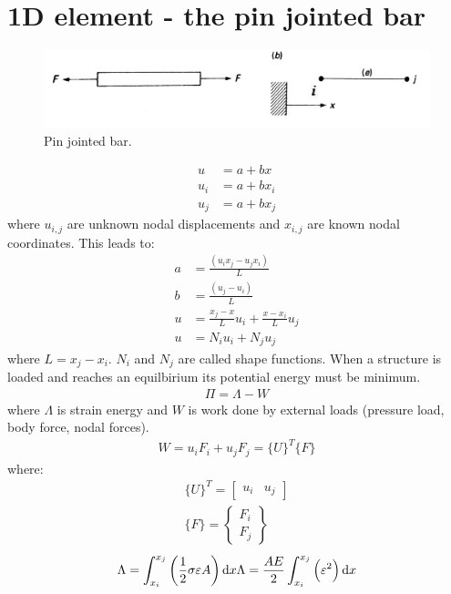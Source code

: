 \documentclass[class=report, crop=false, 12pt,a4paper]{standalone}
\begin{document}
\section{1D element - the pin jointed bar}
\begin{figure}[H]
	\centering
	\includegraphics[width = \textwidth]{../img/figure3.png}
	\caption{Pin jointed bar.}
\end{figure}
\begin{align}
	u &= a + bx\\
	u_i &= a + bx_i\\
	u_j &= a + bx_j
\end{align}
where $u_{i,j}$ are unknown nodal displacements and $x_{i,j}$ are known nodal coordinates. This leads to:
\begin{align}
	a &= \frac{\left(u_ix_j-u_jx_i\right)}{L}\\
	b &= \frac{\left(u_j-u_i\right)}{L}\\
	u&= \frac{x_j-x}{L}u_i + \frac{x-x_i}{L}u_j\\
	u &= N_iu_i + N_ju_j
\end{align}
where $L = x_j - x_i$. $N_i$ and $N_j$ are called shape functions. When a structure is loaded and reaches an equilbirium its potential energy must be minimum.
\begin{gather}
	\Pi = \Lambda - W
\end{gather}
where $\Lambda$ is strain energy and $W$ is work done by external loads (pressure load, body force, nodal forces).
\begin{gather}
	W = u_i F_i + u_j F_j = \{U\}^T \{F\}
\end{gather}
where:
\begin{gather}
	\{U\}^T = \begin{bmatrix}
		u_i & u_j
	\end{bmatrix}\\
	\{F\} = \begin{Bmatrix}
		F_i\\
		F_j
	\end{Bmatrix}
\end{gather}
\begin{gather}
	\Lambda = \int_{x_i}^{x_j}\left(\frac{1}{2}\sigma\varepsilon A\right) \dif x
	\Lambda = \frac{AE}{2}\int_{x_i}^{x_j}\left(\varepsilon^2\right)\dif x
\end{gather}
\end{document}
